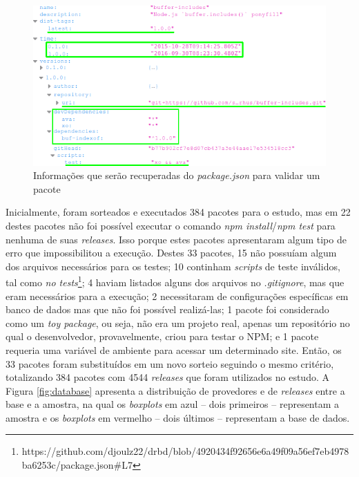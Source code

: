 \begin{figure}
    \centering
    \includegraphics[scale=0.7]{figuras/package_json.png}
    \caption{Informações que serão recuperadas do \textit{package.json} para validar um pacote}
    \label{fig:package_json}
\end{figure}{}

Inicialmente, foram sorteados e executados 384 pacotes para o estudo, mas em 22 destes pacotes não foi possível executar o comando \textit{npm install}/\textit{npm test} para nenhuma de suas \textit{releases}. Isso porque estes pacotes apresentaram algum tipo de erro que impossibilitou a execução. Destes 33 pacotes, 15 não possuíam algum dos arquivos necessários para os testes; 10 continham \textit{scripts} de teste inválidos, tal como \textit{no tests}\footnote{https://github.com/djoulz22/drbd/blob/4920434f92656e6a49f09a56ef7eb4978ba6253c/package.json\#L7}; 4 haviam listados alguns dos arquivos no \textit{.gitignore}, mas que eram necessários para a execução; 2 necessitaram de configurações específicas em banco de dados mas que não foi possível realizá-las; 1 pacote foi considerado como um \textit{toy package}, ou seja, não era um projeto real, apenas um repositório no qual o desenvolvedor, provavelmente, criou para testar o \gls{NPM}; e 1 pacote requeria uma variável de ambiente para acessar um determinado site. Então, os 33 pacotes foram substituídos em um novo sorteio seguindo o mesmo critério, totalizando 384 pacotes com 4544 \textit{releases} que foram utilizados no estudo. A Figura \ref{fig:database} apresenta a distribuição de provedores e de \textit{releases} entre a base e a amostra, na qual os \textit{boxplots} em azul -- dois primeiros -- representam a amostra e os \textit{boxplots} em vermelho -- dois últimos -- representam a base de dados.

